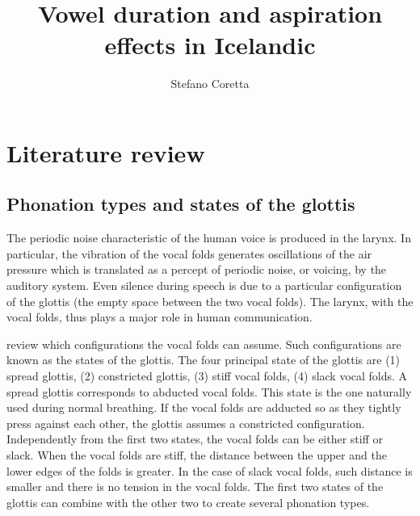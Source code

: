 \documentclass[11pt,a4paper,openany]{memoir}\usepackage[]{graphicx}\usepackage[]{color}
\title{Vowel duration and aspiration effects in Icelandic}
\author{Stefano Coretta}
\begin{document}
\frontmatter

\begin{titlingpage}
\maketitle
\end{titlingpage}

\tableofcontents*





\mainmatter



\chapter{Literature review}
\label{c:review}

\section{Phonation types and states of the glottis}
The periodic noise characteristic of the human voice is produced in the larynx.
In particular, the vibration of the vocal folds generates oscillations of the air pressure which is translated as a percept of periodic noise, or voicing, by the auditory system.
Even silence during speech is due to a particular configuration of the glottis (the empty space between the two vocal folds).
The larynx, with the vocal folds, thus plays a major role in human communication.

\citet{halle2002} review which configurations the vocal folds can assume.
Such configurations are known as the states of the glottis.
The four principal state of the glottis are (1) spread glottis, (2) constricted glottis, (3) stiff vocal folds, (4) slack vocal folds.
A spread glottis corresponds to abducted vocal folds.
This state is the one naturally used during normal breathing.
If the vocal folds are adducted so as they tightly press against each other, the glottis assumes a constricted configuration.
Independently from the first two states, the vocal folds can be either stiff or slack.
When the vocal folds are stiff, the distance between the upper and the lower edges of the folds is greater.
In the case of slack vocal folds, such distance is smaller and there is no tension in the vocal folds.
The first two states of the glottis can combine with the other two to create several phonation types.
\end{document}
